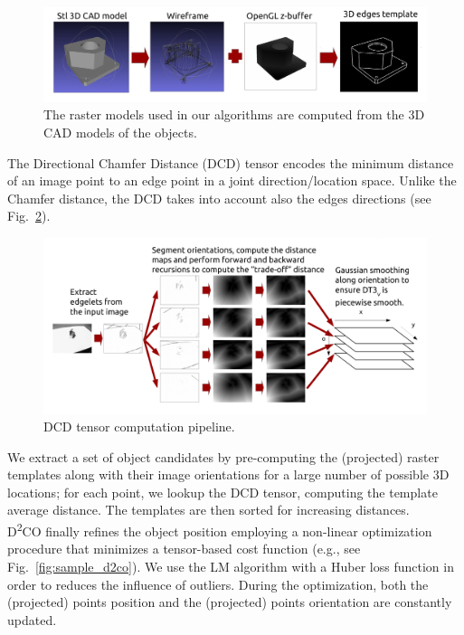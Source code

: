 \documentclass[conference]{IEEEtran}
\begin{document}
\begin{figure}[t!]
\begin{center}
\includegraphics[angle=0,width=\linewidth]{images/d2co_00.png}
\end{center}
\caption{The raster models used in our algorithms are computed from the 3D CAD models of the objects.}\label{fig:obj_model}
\end{figure}
The Directional Chamfer Distance (DCD) tensor encodes the minimum distance of an image point to an edge point in a joint direction/location space. Unlike the Chamfer distance, the DCD takes into account also the edges directions (see Fig.~\ref{fig:tensor}).

\begin{figure}[t!]
\begin{center}
\includegraphics[angle=0,width=\linewidth]{images/d2co_01.png}
\end{center}
\caption{DCD tensor computation pipeline.}\label{fig:tensor}
\end{figure}

We extract a set of object candidates by pre-computing the (projected) raster templates along with their image orientations for a large number of possible 3D locations; for each point, we lookup the DCD tensor, computing the template average distance. The templates are then sorted for increasing distances.\\

D\textsuperscript{2}CO finally refines the object position employing a non-linear optimization procedure that minimizes a tensor-based cost function (e.g., see Fig.~\ref{fig:sample_d2co}). We use the LM algorithm with a Huber loss function in order to reduces the influence of outliers. During the optimization, both the (projected) points position and the (projected) points orientation are constantly updated.
\end{document}
